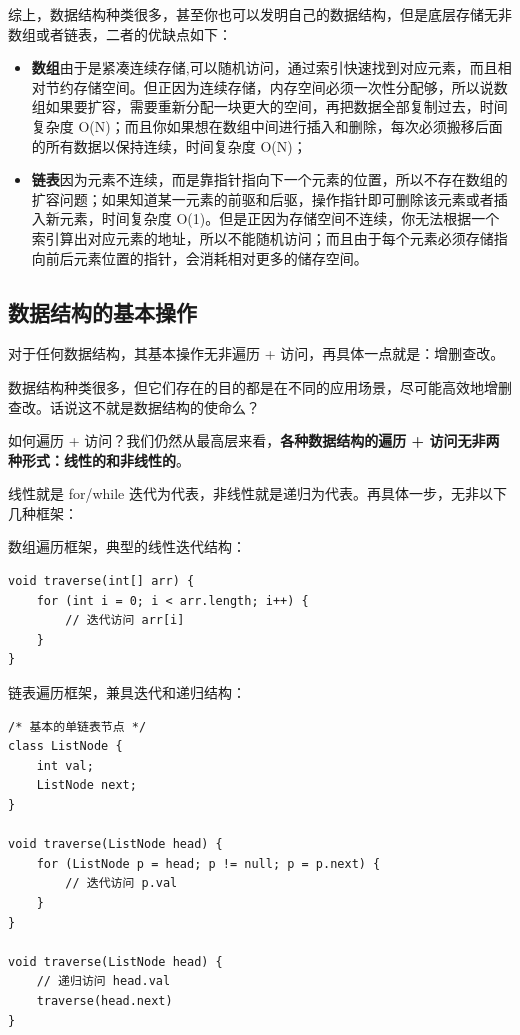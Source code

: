 \documentclass[12pt]{article}
\begin{document}
综上，数据结构种类很多，甚至你也可以发明自己的数据结构，但是底层存储无非数组或者链表，二者的优缺点如下：
\begin{itemize}
\setlength{\itemsep}{0pt}
\setlength{\parsep}{0pt}
\setlength{\parskip}{0pt}
    \item \textbf{数组}由于是紧凑连续存储,可以随机访问，通过索引快速找到对应元素，而且相对节约存储空间。但正因为连续存储，内存空间必须一次性分配够，所以说数组如果要扩容，需要重新分配一块更大的空间，再把数据全部复制过去，时间复杂度 O(N)；而且你如果想在数组中间进行插入和删除，每次必须搬移后面的所有数据以保持连续，时间复杂度 O(N)；
    \item \textbf{链表}因为元素不连续，而是靠指针指向下一个元素的位置，所以不存在数组的扩容问题；如果知道某一元素的前驱和后驱，操作指针即可删除该元素或者插入新元素，时间复杂度 O(1)。但是正因为存储空间不连续，你无法根据一个索引算出对应元素的地址，所以不能随机访问；而且由于每个元素必须存储指向前后元素位置的指针，会消耗相对更多的储存空间。
\end{itemize}

\subsection{数据结构的基本操作}
对于任何数据结构，其基本操作无非遍历 + 访问，再具体一点就是：增删查改。

数据结构种类很多，但它们存在的目的都是在不同的应用场景，尽可能高效地增删查改。话说这不就是数据结构的使命么？

如何遍历 + 访问？我们仍然从最高层来看，\textbf{各种数据结构的遍历 + 访问无非两种形式：线性的和非线性的}。

线性就是 for/while 迭代为代表，非线性就是递归为代表。再具体一步，无非以下几种框架：

数组遍历框架，典型的线性迭代结构：
\begin{lstlisting}
void traverse(int[] arr) {
    for (int i = 0; i < arr.length; i++) {
        // 迭代访问 arr[i]
    }
}
\end{lstlisting}

链表遍历框架，兼具迭代和递归结构：
\begin{lstlisting}
/* 基本的单链表节点 */
class ListNode {
    int val;
    ListNode next;
}

void traverse(ListNode head) {
    for (ListNode p = head; p != null; p = p.next) {
        // 迭代访问 p.val
    }
}

void traverse(ListNode head) {
    // 递归访问 head.val
    traverse(head.next)
}
\end{lstlisting}
\end{document}
